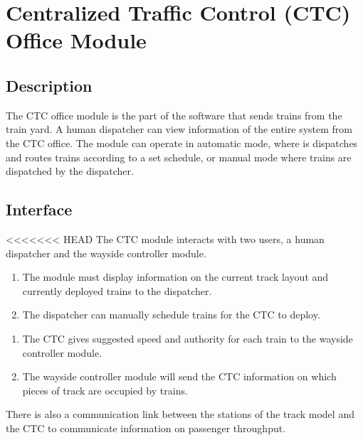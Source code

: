 \documentclass{scrreprt}
\begin{document}
\section{Centralized Traffic Control (CTC) Office Module}

\subsection{Description}
The CTC office module is the part of the software that sends trains from the 
train yard. A human dispatcher can view information of the entire system 
from the CTC office. The module can operate in automatic mode, where is dispatches 
and routes trains according to a set schedule, or manual mode where trains are 
dispatched by the dispatcher.

\subsection{Interface}
<<<<<<< HEAD
The CTC module interacts with two users, a human dispatcher and the wayside controller 
module. 
\begin{enumerate}
    \item The module must display information on the current track layout and currently 
    deployed trains to the dispatcher. 
    \item The dispatcher can manually schedule trains for the CTC to deploy. 
\end{enumerate}
\begin{enumerate}
    \item The CTC gives suggested speed and authority for each train to the wayside 
    controller module. 
    \item The wayside controller module will send the CTC information on which pieces of 
    track are occupied by trains. 
\end{enumerate}
There is also a communication link between the stations of the track model and the 
CTC to communicate information on passenger throughput.
\end{document}
